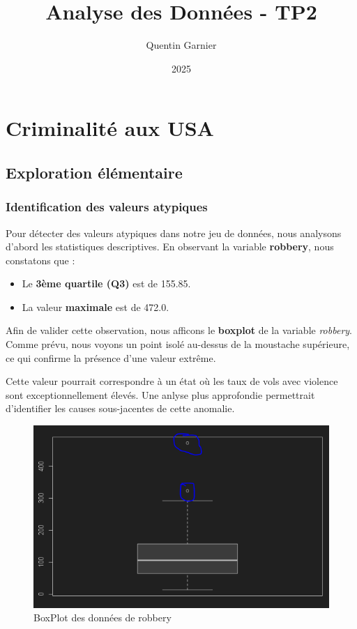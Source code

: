\documentclass{article}
\title{\textbf{Analyse des Donn\'ees - TP2}}
\author{Quentin Garnier}
\date{2025}
\begin{document}
    \maketitle

    \section{Criminalité aux USA}
    \subsection{Exploration élémentaire}
    \subsubsection{Identification des valeurs atypiques}

    Pour détecter des valeurs atypiques dans notre jeu de données, nous analysons d'abord les statistiques descriptives. En observant la variable \textbf{robbery}, nous constatons que :

    \begin{itemize}
        \item Le \textbf{3ème quartile (Q3)} est de 155.85.
        \item La valeur \textbf{maximale} est de 472.0.
    \end{itemize}

    Afin de valider cette observation, nous afficons le \textbf{boxplot} de la variable \textit{robbery}. Comme prévu, nous voyons un point isolé au-dessus de la moustache supérieure, ce qui confirme la présence d'une valeur extrême.

    Cette valeur pourrait correspondre à un état où les taux de vols avec violence sont exceptionnellement élevés. Une anlyse plus approfondie permettrait d'identifier les causes sous-jacentes de cette anomalie.

    \begin{figure}[H]
        \centering
        \includegraphics[width=0.5\linewidth]{img/robbery_data_boxplot}
        \caption{BoxPlot des données de robbery}
    \end{figure}
\end{document}
